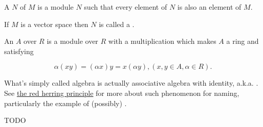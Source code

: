 \begin{remark}
    \label{mk:Submodule}

    A  $N$ of $M$ is a module $N$ such that every element of $N$ is also an element of $M$.

    If $M$ is a vector space then $N$ is called a .

\end{remark}





    

\begin{definition}[Algebra]
    \label{Algebra}
    \leanok

    An  $A$ over $R$ is a module over $R$ with a multiplication which makes $A$ a ring and satisfying

    $$
    \alpha(x y)=(\alpha x) y=x(\alpha y),(x, y \in A, \alpha \in R) .
    $$

\end{definition}

\begin{remark}
    \label{mk:Algebra}

    What's simply called algebra is actually associative algebra with identity, a.k.a. . See
    \href{https://ncatlab.org/nlab/show/red%20herring%20principle}{the red herring principle}
    for more about such phenomenon for naming, particularly the example of (possibly) .
    
\end{remark}

\begin{definition}[RingHom]
    \label{RingHom}

    TODO

\end{definition}


